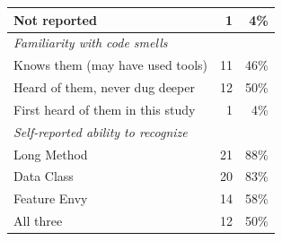 \begin{table}[ht]
\begin{tabular}{lrr}
\quad Not reported & 1 & 4\% \\
\midrule
\multicolumn{3}{l}{\textit{Familiarity with code smells}} \\
\quad Knows them (may have used tools) & 11 & 46\% \\
\quad Heard of them, never dug deeper & 12 & 50\% \\
\quad First heard of them in this study & 1 & 4\% \\
\midrule
\multicolumn{3}{l}{\textit{Self-reported ability to recognize}} \\
\quad Long Method & 21 & 88\% \\
\quad Data Class & 20 & 83\% \\
\quad Feature Envy & 14 & 58\% \\
\quad All three & 12 & 50\% \\
\bottomrule
\end{tabular}
\end{table}
